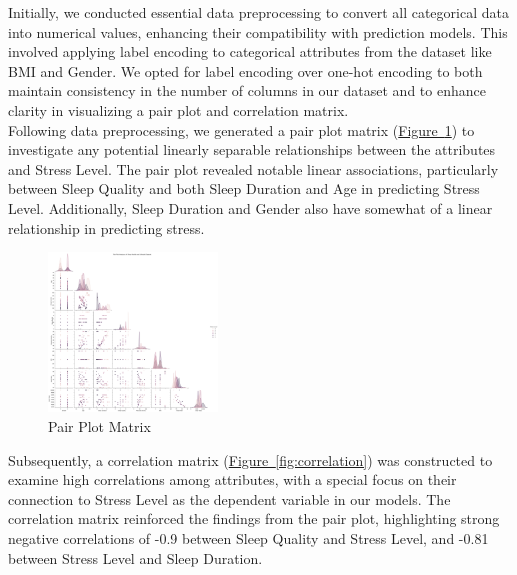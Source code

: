 \documentclass[11pt, letterpaper]{article}
\begin{document}
    \noindent Initially, we conducted essential data preprocessing to convert all categorical data into numerical values, enhancing their compatibility with prediction models. This involved applying label encoding to categorical attributes from the dataset like BMI and Gender. We opted for label encoding over one-hot encoding to both maintain consistency in the number of columns in our dataset and to enhance clarity in visualizing a pair plot and correlation matrix.\\
    
    \noindent Following data preprocessing, we generated a pair plot matrix (\hyperref[fig:pairplot]{Figure~\ref*{fig:pairplot}}) to investigate any potential linearly separable relationships between the attributes and Stress Level. The pair plot revealed notable linear associations, particularly between Sleep Quality and both Sleep Duration and Age in predicting Stress Level. Additionally, Sleep Duration and Gender also have somewhat of a linear relationship in predicting stress.\\
    
    \begin{figure}[H]
        \centering
        \includegraphics[width=0.40\textwidth]{pairplot.png}
        \caption{Pair Plot Matrix}
        \label{fig:pairplot}
    \end{figure}

    \noindent Subsequently, a correlation matrix (\hyperref[fig:correlation]{Figure~\ref*{fig:correlation}}) was constructed to examine high correlations among attributes, with a special focus on their connection to Stress Level as the dependent variable in our models. The correlation matrix reinforced the findings from the pair plot, highlighting strong negative correlations of -0.9 between Sleep Quality and Stress Level, and -0.81 between Stress Level and Sleep Duration.
    
\end{document}
